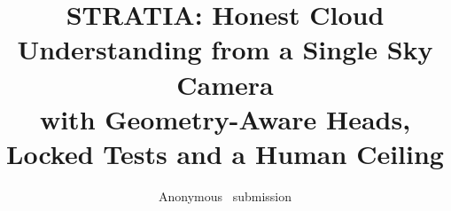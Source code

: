 \documentclass[10pt,twocolumn,letterpaper]{article}
\title{STRATIA: Honest Cloud Understanding from a Single Sky Camera\\
with Geometry-Aware Heads, Locked Tests and a Human Ceiling}
\author{Anonymous \confName~submission\\
}
\begin{document}
\maketitle








{
    \small
    
    
}
\end{document}
